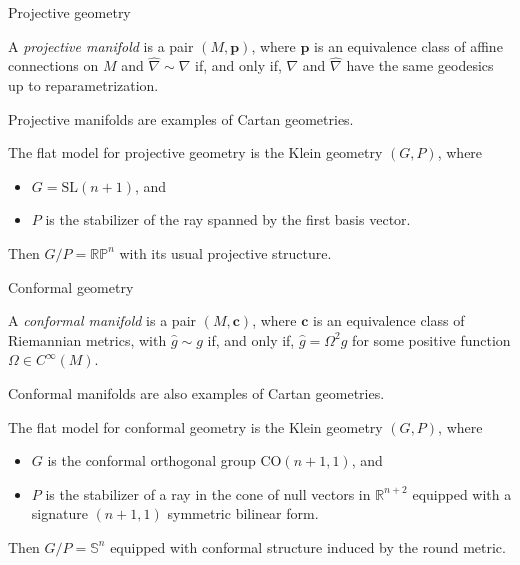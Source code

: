 \documentclass[handout]{beamer}
\renewcommand{\hat}{\widehat}
\newcommand{\RR}{\mathbb{R}}
\begin{document}
\begin{frame}{Projective geometry}
  \begin{definition}
    A \emph{projective manifold} is a pair $(M, \bm{p})$, where $\bm{p}$ is an equivalence class of affine connections on $M$ and $\hat{\nabla} \sim \nabla$ if, and only if, $\nabla$ and $\hat{\nabla}$ have the same geodesics up to reparametrization.
  \end{definition}

  Projective manifolds are examples of Cartan geometries.

  The flat model for projective geometry is the Klein geometry $(G,P)$, where
  \begin{itemize}
    \item $G = \text{SL}(n+1)$, and 
    \item $P$ is the stabilizer of the ray spanned by the first basis vector.
  \end{itemize}
  Then $G/P = \RR \mathbb{P}^n$ with its usual projective structure.
\end{frame}

\begin{frame}{Conformal geometry}

  \begin{definition}
    A \emph{conformal manifold} is a pair \( (M, \bm{c}) \), where \( \bm{c} \) is an equivalence class of Riemannian metrics, with \( \hat{g} \sim g \) if, and only if, \( \hat{g} = \Omega^2 g \) for some positive function \( \Omega \in C^\infty (M) \).
  \end{definition}

      Conformal manifolds are also examples of Cartan geometries.
      \vspace{1em}

      The flat model for conformal geometry is the Klein geometry $(G,P)$, where 
      \begin{itemize}
        \item $G$ is the conformal orthogonal group $\text{CO}(n+1,1)$, and 
        \item $P$ is the stabilizer of a ray in the cone of null vectors in $\RR^{n+2}$ equipped with a signature $(n+1,1)$ symmetric bilinear form.
      \end{itemize}
      Then $G/P = \mathbb{S}^n$ equipped with conformal structure induced by the round metric.
\end{frame}
\end{document}
